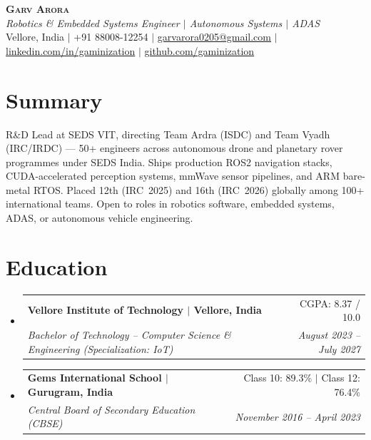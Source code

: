 \documentclass[letterpaper,9pt]{extarticle}
\makeatletter
\newcommand{\resumeSubheading}[4]{
  \item
    \begin{tabular*}{0.97\textwidth}[t]{l@{\extracolsep{\fill}}r}
      \textbf{#1} & \small #2 \\
      \textit{\small#3} & \textit{\small #4} \\
    \end{tabular*}\vspace{-5pt}
}
\newcommand{\resumeSubHeadingListStart}{
  \begin{itemize}[leftmargin=0.15in, label={}, itemsep=5pt, parsep=0pt, topsep=3pt]
}
\newcommand{\resumeSubHeadingListEnd}{\end{itemize}}
\makeatother
\begin{document}
\begin{center}
    \textbf{\Huge \scshape Garv Arora} \\ \vspace{2pt}
    \small\textit{Robotics \& Embedded Systems Engineer $|$ Autonomous Systems $|$ ADAS} \\ \vspace{2pt}
    \small Vellore, India $|$
    +91 88008-12254 $|$
    \href{mailto:garvarora0205@gmail.com}{garvarora0205@gmail.com} $|$
    \href{https://linkedin.com/in/gaminization}{linkedin.com/in/gaminization} $|$
    \href{https://github.com/gaminization}{github.com/gaminization}
\end{center}

\section{Summary}
\vspace{1pt}
\small{R\&D Lead at SEDS VIT, directing Team Ardra (ISDC) and Team Vyadh (IRC/IRDC) --- 50+ engineers across autonomous drone and planetary rover programmes under SEDS India. Ships production ROS2 navigation stacks, CUDA-accelerated perception systems, mmWave sensor pipelines, and ARM bare-metal RTOS. Placed 12th (IRC~2025) and 16th (IRC~2026) globally among 100+ international teams. Open to roles in robotics software, embedded systems, ADAS, or autonomous vehicle engineering.}

\section{Education}
  \resumeSubHeadingListStart
    \resumeSubheading
      {Vellore Institute of Technology $|$ Vellore, India}{CGPA: 8.37 / 10.0}
      {Bachelor of Technology -- Computer Science \& Engineering (Specialization: IoT)}{August 2023 -- July 2027}
    \resumeSubheading
      {Gems International School $|$ Gurugram, India}{Class 10: 89.3\% $|$ Class 12: 76.4\%}
      {Central Board of Secondary Education (CBSE)}{November 2016 -- April 2023}
  \resumeSubHeadingListEnd

\end{document}
